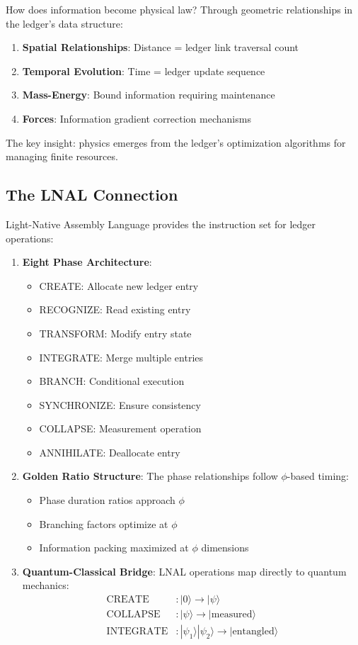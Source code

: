 \documentclass[12pt,letterpaper]{article}
\begin{document}
How does information become physical law? Through geometric relationships in the ledger's data structure:

\begin{enumerate}
\item \textbf{Spatial Relationships}: Distance = ledger link traversal count
\item \textbf{Temporal Evolution}: Time = ledger update sequence
\item \textbf{Mass-Energy}: Bound information requiring maintenance
\item \textbf{Forces}: Information gradient correction mechanisms
\end{enumerate}

The key insight: physics emerges from the ledger's optimization algorithms for managing finite resources.

\subsection{The LNAL Connection}

Light-Native Assembly Language provides the instruction set for ledger operations:

\begin{enumerate}
\item \textbf{Eight Phase Architecture}:
\begin{itemize}
\item CREATE: Allocate new ledger entry
\item RECOGNIZE: Read existing entry
\item TRANSFORM: Modify entry state
\item INTEGRATE: Merge multiple entries
\item BRANCH: Conditional execution
\item SYNCHRONIZE: Ensure consistency
\item COLLAPSE: Measurement operation
\item ANNIHILATE: Deallocate entry
\end{itemize}

\item \textbf{Golden Ratio Structure}:
The phase relationships follow $\phi$-based timing:
\begin{itemize}
\item Phase duration ratios approach $\phi$
\item Branching factors optimize at $\phi$
\item Information packing maximized at $\phi$ dimensions
\end{itemize}

\item \textbf{Quantum-Classical Bridge}:
LNAL operations map directly to quantum mechanics:
\begin{align}
\text{CREATE} &: |0\rangle \to |\psi\rangle \\
\text{COLLAPSE} &: |\psi\rangle \to |\text{measured}\rangle \\
\text{INTEGRATE} &: |\psi_1\rangle|\psi_2\rangle \to |\text{entangled}\rangle
\end{align}
\end{enumerate}
\end{document}
